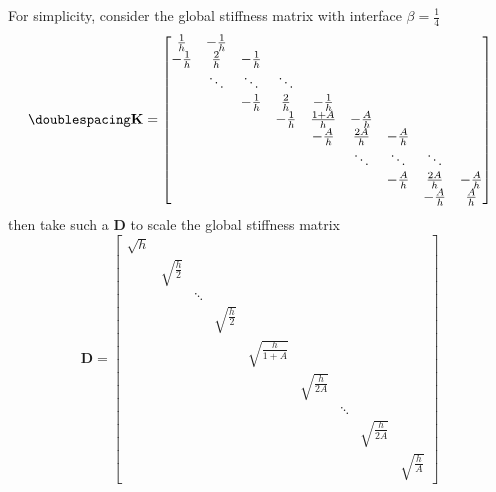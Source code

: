 \documentclass[12pt]{article}
\begin{document}
For simplicity, consider the global stiffness matrix with interface $\beta=\frac{1}{4}$
\[
\doublespacing
\textbf{K}=
\begin{bmatrix}
\frac{1}{h} & -\frac{1}{h} \\
-\frac{1}{h} & \frac{2}{h} & -\frac{1}{h} \\
& \ddots & \ddots & \ddots \\
&& -\frac{1}{h} & \frac{2}{h} & -\frac{1}{h} \\
&&& -\frac{1}{h} & \frac{1+A}{h} & -\frac{A}{h} \\
&&&& -\frac{A}{h} & \frac{2A}{h} & -\frac{A}{h} \\
&&&&& \ddots & \ddots & \ddots \\
&&&&&& -\frac{A}{h} & \frac{2A}{h} & -\frac{A}{h} \\
&&&&&&& -\frac{A}{h} & \frac{A}{h}
\end{bmatrix}
\]
then take such a $\textbf{D}$ to scale the global stiffness matrix
\[
\textbf{D}=
\begin{bmatrix}
\sqrt{h} \\
& \sqrt{\frac{h}{2}} \\
&& \ddots \\
&&& \sqrt{\frac{h}{2}} \\
&&&& \sqrt{\frac{h}{1+A}} \\
&&&&& \sqrt{\frac{h}{2A}} \\
&&&&&& \ddots \\
&&&&&&& \sqrt{\frac{h}{2A}} \\
&&&&&&&& \sqrt{\frac{h}{A}}   
\end{bmatrix}
\]
\end{document}
